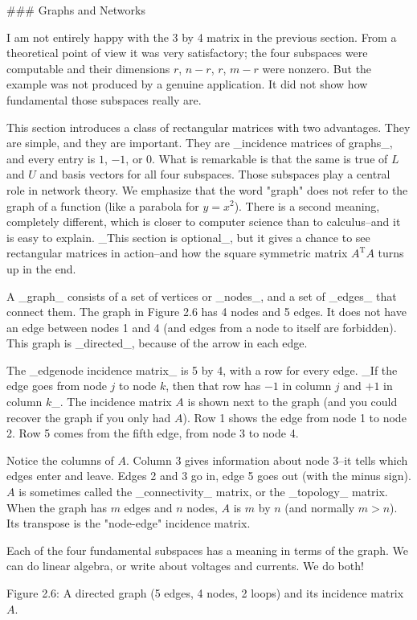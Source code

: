 

### Graphs and Networks

I am not entirely happy with the 3 by 4 matrix in the previous section. From a theoretical point of view it was very satisfactory; the four subspaces were computable and their dimensions \(r\), \(n-r\), \(r\), \(m-r\) were nonzero. But the example was not produced by a genuine application. It did not show how fundamental those subspaces really are.

This section introduces a class of rectangular matrices with two advantages. They are simple, and they are important. They are _incidence matrices of graphs_, and every entry is \(1\), \(-1\), or \(0\). What is remarkable is that the same is true of \(L\) and \(U\) and basis vectors for all four subspaces. Those subspaces play a central role in network theory. We emphasize that the word "graph" does not refer to the graph of a function (like a parabola for \(y=x^{2}\)). There is a second meaning, completely different, which is closer to computer science than to calculus--and it is easy to explain. _This section is optional_, but it gives a chance to see rectangular matrices in action--and how the square symmetric matrix \(A^{\mathrm{T}}A\) turns up in the end.

A _graph_ consists of a set of vertices or _nodes_, and a set of _edges_ that connect them. The graph in Figure 2.6 has 4 nodes and 5 edges. It does not have an edge between nodes 1 and 4 (and edges from a node to itself are forbidden). This graph is _directed_, because of the arrow in each edge.

The _edgenode incidence matrix_ is 5 by 4, with a row for every edge. _If the edge goes from node \(j\) to node \(k\), then that row has \(-1\) in column \(j\) and \(+1\) in column \(k\)_. The incidence matrix \(A\) is shown next to the graph (and you could recover the graph if you only had \(A\)). Row 1 shows the edge from node 1 to node 2. Row 5 comes from the fifth edge, from node 3 to node 4.

Notice the columns of \(A\). Column 3 gives information about node 3--it tells which edges enter and leave. Edges 2 and 3 go in, edge 5 goes out (with the minus sign). \(A\) is sometimes called the _connectivity_ matrix, or the _topology_ matrix. When the graph has \(m\) edges and \(n\) nodes, \(A\) is \(m\) by \(n\) (and normally \(m>n\)). Its transpose is the "node-edge" incidence matrix.

Each of the four fundamental subspaces has a meaning in terms of the graph. We can do linear algebra, or write about voltages and currents. We do both!

Figure 2.6: A directed graph (5 edges, 4 nodes, 2 loops) and its incidence matrix \(A\).

